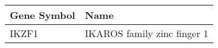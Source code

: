 \begin{tabular}{ll}
\toprule
Gene Symbol &                        Name \\
\midrule
      IKZF1 & IKAROS family zinc finger 1 \\
\bottomrule
\end{tabular}
